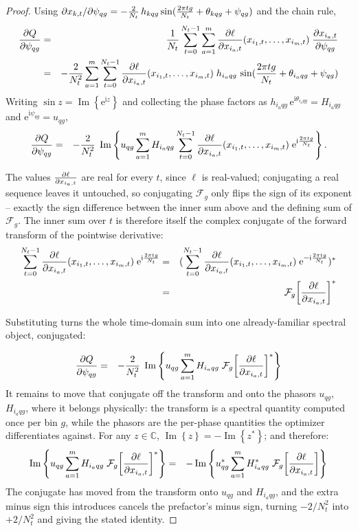 \documentclass[10pt,a4paper]{article}
\numberwithin{equation}{section}
\DeclarePairedDelimiter\block{[}{]}
\DeclarePairedDelimiter\mat{(}{)}
\DeclareMathOperator{\Imag}{Im}
\newcommand{\im}[1]{\Imag\left\{#1\right\}}
\newcommand{\m}[1]{\mathrm{#1}}
\begin{document}
\begin{proof}
Using $\partial x_{k,t}/\partial \psi_{q g} = -\frac{2}{N_t}\, h_{k q g}\sin\mat{\frac{2 \pi t g}{N_t} + \theta_{k q g} + \psi_{q g}}$ and the chain rule,
\begin{eqnarray}
\frac{\partial Q}{\partial \psi_{q g}}
	&=& \frac{1}{N_t}\sum_{t=0}^{N_t-1}\sum_{a=1}^{m}
			  \partialEllX \;
			  \frac{\partial x_{i_a,t}}{\partial \psi_{q g}} \\
	&=& -\frac{2}{N_t^2}\sum_{a=1}^{m}
			\sum_{t=0}^{N_t-1}
				\partialEllX \;
				h_{i_a q g}\,\sin\mat{\frac{2 \pi t g}{N_t} + \theta_{i_a q g} + \psi_{q g}}
\end{eqnarray}
Writing $\sin z = \im{\m{e}^{\m{i} z}}$ and collecting the phase factors as $h_{i_a q g}\,\m{e}^{\m{i}\theta_{i_a q g}} = H_{i_a q g}$ and $\m{e}^{\m{i}\psi_{q g}} = u_{q g}$,
\begin{eqnarray}
\frac{\partial Q}{\partial \psi_{q g}}
	&=& -\frac{2}{N_t^2}\;\im{u_{q g} \sum_{a=1}^{m} H_{i_a q g} 
			\sum_{t=0}^{N_t-1}
				\partialEllX \;
				\m{e}^{\m{i}\frac{2 \pi t g}{N_t}}}.
\end{eqnarray}

The values $\frac{\partial \ell}{\partial x_{i_a,t}}$ are real for every $t$, since $\ell$ is real-valued; conjugating a real sequence leaves it untouched, so conjugating $\mathcal{F}_g$ only flips the sign of its exponent -- exactly the sign difference between the inner sum above and the defining sum of $\mathcal{F}_g$. The inner sum over $t$ is therefore itself the complex conjugate of the forward transform of the pointwise derivative:
\begin{eqnarray}
	    \sum_{t=0}^{N_t-1}
			\partialEllX\;
			\m{e}^{\m{i}\frac{2 \pi t g}{N_t}}
	&=& \mat{
		\sum_{t=0}^{N_t-1}
			\partialEllX \;
			\m{e}^{-\m{i}\frac{2 \pi t g}{N_t}}}^{*} \\
	&=& \mathcal{F}_g\block*{\partialEll}^{*}
\end{eqnarray}

Substituting turns the whole time-domain sum into one already-familiar spectral object, conjugated:

\begin{eqnarray}
\frac{\partial Q}{\partial \psi_{q g}}
	&=& -\frac{2}{N_t^2}\;
			\im{u_{q g} 
		  		\sum_{a=1}^{m} H_{i_a q g}\;
		  			\mathcal{F}_g\block*{\partialEll}^{*}}
\end{eqnarray}
It remains to move that conjugate off the transform and onto the phasors $u_{qg}$, $H_{i_a qg}$, where it belongs physically: the transform is a spectral quantity computed once per bin $g$, while the phasors are the per-phase quantities the optimizer differentiates against. For any $z\in\mathbb{C}$, $\im{z}=-\im{z^*}$; and therefore:
\begin{eqnarray}
		\im{u_{q g} \sum_{a=1}^{m} H_{i_a q g}\;
			\mathcal{F}_g\block*{\partialEll}^{*}}
	&=& -\im{u_{q g}^{*} \sum_{a=1}^{m} H_{i_a q g}^{*}\;
			\mathcal{F}_g\block*{\partialEll}}
\end{eqnarray}
The conjugate has moved from the transform onto $u_{qg}$ and $H_{i_a qg}$, and the extra minus sign this introduces cancels the prefactor's minus sign, turning $-2/N_t^2$ into $+2/N_t^2$ and giving the stated identity.
\end{proof}
\end{document}
